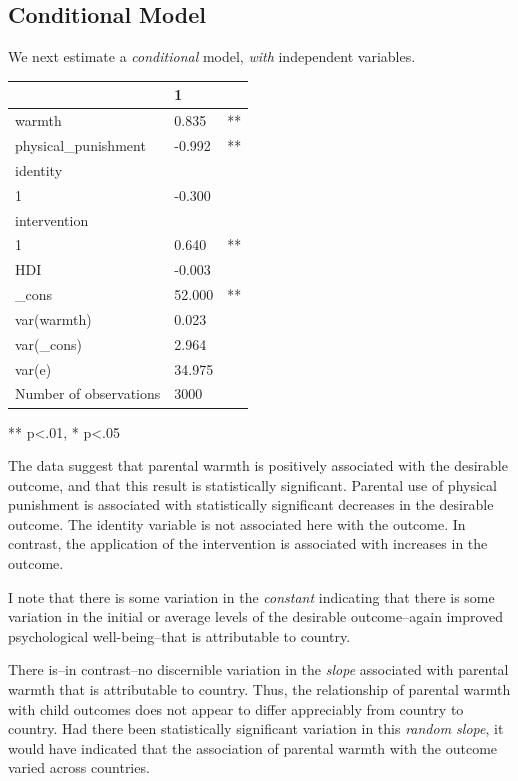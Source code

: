 \documentclass[
  letterpaper,
  DIV=11,
  numbers=noendperiod]{scrreprt}
\begin{document}
\subsection{Conditional Model}\label{sec-conditional-model}

We next estimate a \emph{conditional} model, \emph{with} independent
variables.

\begin{longtable}[]{@{}lll@{}}
\toprule\noalign{}
& 1 & \\
\midrule\noalign{}
\endhead
\bottomrule\noalign{}
\endlastfoot
warmth & 0.835 & ** \\
physical\_punishment & -0.992 & ** \\
identity & & \\
1 & -0.300 & \\
intervention & & \\
1 & 0.640 & ** \\
HDI & -0.003 & \\
\_cons & 52.000 & ** \\
var(warmth) & 0.023 & \\
var(\_cons) & 2.964 & \\
var(e) & 34.975 & \\
Number of observations & 3000 & \\
\end{longtable}

** p\textless.01, * p\textless.05

The data suggest that parental warmth is positively associated with the
desirable outcome, and that this result is statistically significant.
Parental use of physical punishment is associated with statistically
significant decreases in the desirable outcome. The identity variable is
not associated here with the outcome. In contrast, the application of
the intervention is associated with increases in the outcome.

I note that there is some variation in the \emph{constant} indicating
that there is some variation in the initial or average levels of the
desirable outcome--again improved psychological well-being--that is
attributable to country.

There is--in contrast--no discernible variation in the \emph{slope}
associated with parental warmth that is attributable to country. Thus,
the relationship of parental warmth with child outcomes does not appear
to differ appreciably from country to country. Had there been
statistically significant variation in this \emph{random slope}, it
would have indicated that the association of parental warmth with the
outcome varied across countries.
\end{document}
